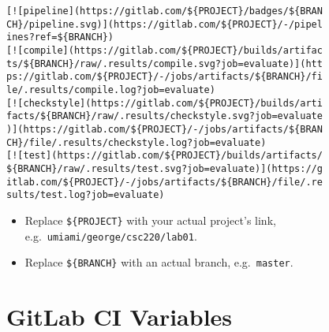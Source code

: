 \begin{enumerate}
\begin{verbatim}
[![pipeline](https://gitlab.com/${PROJECT}/badges/${BRAN
CH}/pipeline.svg)](https://gitlab.com/${PROJECT}/-/pipel
ines?ref=${BRANCH})
[![compile](https://gitlab.com/${PROJECT}/builds/artifac
ts/${BRANCH}/raw/.results/compile.svg?job=evaluate)](htt
ps://gitlab.com/${PROJECT}/-/jobs/artifacts/${BRANCH}/fi
le/.results/compile.log?job=evaluate)
[![checkstyle](https://gitlab.com/${PROJECT}/builds/arti
facts/${BRANCH}/raw/.results/checkstyle.svg?job=evaluate
)](https://gitlab.com/${PROJECT}/-/jobs/artifacts/${BRAN
CH}/file/.results/checkstyle.log?job=evaluate)
[![test](https://gitlab.com/${PROJECT}/builds/artifacts/
${BRANCH}/raw/.results/test.svg?job=evaluate)](https://g
itlab.com/${PROJECT}/-/jobs/artifacts/${BRANCH}/file/.re
sults/test.log?job=evaluate)
\end{verbatim}

  \begin{itemize}
  \item
    Replace \texttt{\$\{PROJECT\}} with your actual project's link, \\e.g.~\texttt{umiami/george/csc220/lab01}.
  \item
    Replace \texttt{\$\{BRANCH\}} with an actual branch, e.g.~\texttt{master}.
  \end{itemize}
\end{enumerate}

\section{GitLab CI Variables}\label{gitlab-ci-variables}


